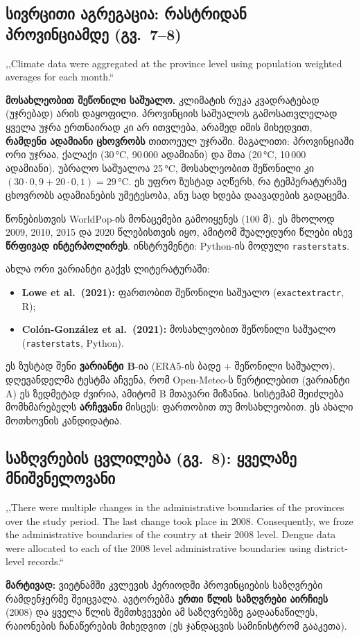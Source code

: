 \documentclass[11pt,a4paper]{article}
\newcommand{\q}[1]{,,#1``}
\begin{document}
\subsection{სივრცითი აგრეგაცია: რასტრიდან პროვინციამდე (გვ.\ 7--8)}
\begin{citata}
\q{Climate data were aggregated at the province level using population weighted averages for each month.}
\end{citata}

\begin{ganmarteba}
\textbf{მოსახლეობით შეწონილი საშუალო.} კლიმატის რუკა კვადრატებად (უჯრებად) არის დაყოფილი. პროვინციის
საშუალოს გამოსათვლელად ყველა უჯრა ერთნაირად კი არ ითვლება, არამედ იმის მიხედვით, \textbf{რამდენი ადამიანი
ცხოვრობს} თითოეულ უჯრაში. მაგალითი: პროვინციაში ორი უჯრაა, ქალაქი (30\,°C, 90\,000 ადამიანი) და მთა
(20\,°C, 10\,000 ადამიანი). უბრალო საშუალოა 25\,°C, მოსახლეობით შეწონილი კი
$(30\cdot 0{,}9 + 20\cdot 0{,}1) = 29\,$°C. ეს უფრო ზუსტად აღწერს, რა ტემპერატურაზე ცხოვრობს ადამიანების
უმეტესობა, ანუ სად ხდება დაავადების გადაცემა.
\end{ganmarteba}

\noindent წონებისთვის WorldPop-ის მონაცემები გამოიყენეს (100 მ). ეს მხოლოდ 2009, 2010, 2015 და 2020 წლებისთვის
იყო, ამიტომ შუალედური წლები ისევ \textbf{წრფივად ინტერპოლირეს}. ინსტრუმენტი: Python-ის მოდული
\texttt{rasterstats}.

\begin{mnishvn}
ახლა ორი ვარიანტი გაქვს ლიტერატურაში:
\begin{itemize}[nosep]
  \item \textbf{Lowe et al.\ (2021):} ფართობით შეწონილი საშუალო (\texttt{exactextractr}, R);
  \item \textbf{Colón-González et al.\ (2021):} მოსახლეობით შეწონილი საშუალო (\texttt{rasterstats}, Python).
\end{itemize}
ეს ზუსტად შენი \textbf{ვარიანტი B}-ია (ERA5-ის ბადე + შეწონილი საშუალო). დღევანდელმა ტესტმა აჩვენა, რომ
Open-Meteo-ს წერტილებით (ვარიანტი A) ეს ზედმეტად ძვირია, ამიტომ B მთავარი მიზანია. სისტემამ შეიძლება
მომხმარებელს \textbf{არჩევანი} მისცეს: ფართობით თუ მოსახლეობით. ეს ახალი მოთხოვნის კანდიდატია.
\end{mnishvn}

\subsection{საზღვრების ცვლილება (გვ.\ 8): ყველაზე მნიშვნელოვანი}
\begin{citata}
\q{There were multiple changes in the administrative boundaries of the provinces over the study period. The last
change took place in 2008. Consequently, we froze the administrative boundaries of the country at their 2008 level.
Dengue data were allocated to each of the 2008 level administrative boundaries using district-level records.}
\end{citata}
\noindent\textbf{მარტივად:} ვიეტნამში კვლევის პერიოდში პროვინციების საზღვრები რამდენჯერმე შეიცვალა. ავტორებმა
\textbf{ერთი წლის საზღვრები აირჩიეს} (2008) და ყველა წლის შემთხვევები ამ საზღვრებზე გადაანაწილეს, რაიონების
ჩანაწერების მიხედვით (ეს ჯანდაცვის სამინისტრომ გააკეთა).
\end{document}
